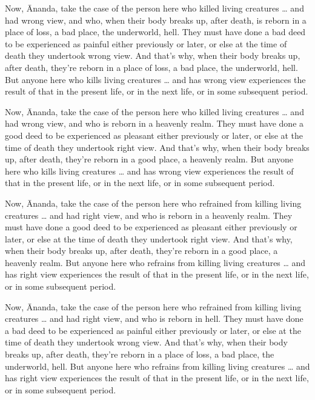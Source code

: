 \documentclass[12pt,openany]{book}%
\begin{document}
Now, Ānanda, take the case of the person here who killed living creatures … and had wrong view, and who, when their body breaks up, after death, is reborn in a place of loss, a bad place, the underworld, hell. They must have done a bad deed to be experienced as painful either previously or later, or else at the time of death they undertook wrong view. And that’s why, when their body breaks up, after death, they’re reborn in a place of loss, a bad place, the underworld, hell. But anyone here who kills living creatures … and has wrong view experiences the result of that in the present life, or in the next life, or in some subsequent period. 

Now, Ānanda, take the case of the person here who killed living creatures … and had wrong view, and who is reborn in a heavenly realm. They must have done a good deed to be experienced as pleasant either previously or later, or else at the time of death they undertook right view. And that’s why, when their body breaks up, after death, they’re reborn in a good place, a heavenly realm. But anyone here who kills living creatures … and has wrong view experiences the result of that in the present life, or in the next life, or in some subsequent period. 

Now, Ānanda, take the case of the person here who refrained from killing living creatures … and had right view, and who is reborn in a heavenly realm. They must have done a good deed to be experienced as pleasant either previously or later, or else at the time of death they undertook right view. And that’s why, when their body breaks up, after death, they’re reborn in a good place, a heavenly realm. But anyone here who refrains from killing living creatures … and has right view experiences the result of that in the present life, or in the next life, or in some subsequent period. 

Now, Ānanda, take the case of the person here who refrained from killing living creatures … and had right view, and who is reborn in hell. They must have done a bad deed to be experienced as painful either previously or later, or else at the time of death they undertook wrong view. And that’s why, when their body breaks up, after death, they’re reborn in a place of loss, a bad place, the underworld, hell. But anyone here who refrains from killing living creatures … and has right view experiences the result of that in the present life, or in the next life, or in some subsequent period. 
\end{document}
